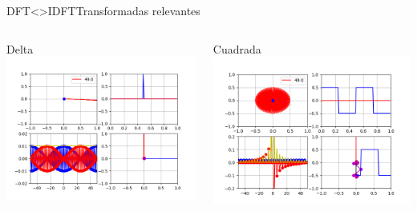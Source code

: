 \begin{frame}{DFT<>IDFT}{Transformadas relevantes}
   \begin{columns}[c]
      \begin{column}{.5\textwidth}
         Delta
         \centering\includegraphics[width=1.0\textwidth]{3_clase/euler_delta}
      \end{column}
      \begin{column}{.5\textwidth}
         Cuadrada
         \centering\includegraphics[width=1.0\textwidth]{3_clase/euler_cuadrada}
      \end{column}
   \end{columns}
   \vfill
\end{frame}
